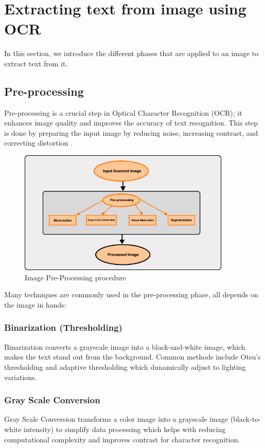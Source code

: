 \section{Extracting text from image using OCR}
In this section, we introduce the different phases that are applied to an image to extract text from it. %

\subsection{Pre-processing}
Pre-processing is a crucial step in Optical Character Recognition (OCR); it enhances image quality and improves the accuracy of text recognition. This step is done by preparing the input image by reducing noise, increasing contrast, and correcting distortion \cite{bieniecki2007image}. %
\begin{figure}[H]
    \centering
    \includegraphics[width=0.90\textwidth]{Figures/Chapter 1/pre-processing.jpg}
    \caption{Image Pre-Processing procedure}
    \label{fig:imgpreprocess}
\end{figure}


Many techniques are commonly used in the pre-processing phase, all depends on the image in hands:


\subsubsection{Binarization (Thresholding)}
Binarization converts a grayscale image into a black-and-white image, which makes the text stand out from the background. Common methods include Otsu's thresholding and adaptive thresholding which dunamically adjust to lighting variations.%

\subsubsection{Gray Scale Conversion}
Gray Scale Conversion transforms a color image into a grayscale image (black-to-white intensity) to simplify data processing which helps with reducing computational complexity and improves contrast for character recognition.%
    

